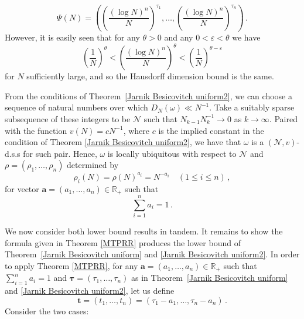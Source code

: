 \documentclass{amsart}
\theoremstyle{definition}
\newcommand{\R}{\mathbb R}
\newcommand{\0}{\mbf 0}%
\newcommand{\cN}{{\mathcal N}}
\def\R{\mathbb R}
\begin{document}
    \begin{equation*}
        \Psi(N)=\left(\left(\frac{(\log N)^{n}}{N}\right)^{\tau_{1}},\dots, \left(\frac{(\log N)^{n}}{N}\right)^{\tau_{n}} \right)\, .
    \end{equation*}
    However, it is easily seen that for any $\theta>0$ and any $0<\varepsilon< \theta$ we have  
    \begin{equation*}
        \left(\frac{1}{N}\right)^{\theta}<\left(\frac{(\log N)^{n}}{N}\right)^{\theta}<\left(\frac{1}{N}\right)^{\theta-\varepsilon}
    \end{equation*}
    for $N$ sufficiently large, and so the Hausdorff dimension bound is the same. \par 
    From the conditions of Theorem~\ref{Jarnik Besicovitch uniform2}, we can choose a sequence of natural numbers over which $D_{N}(\omega)\ll N^{-1}$. Take a suitably sparse subsequence of these integers to be $\cN$ such that $N_{k-1}N_{k}^{-1}\to 0$ as $k \to \infty$. Paired with the function $v(N)=cN^{-1}$, where $c$ is the implied constant in the condition of Theorem \ref{Jarnik Besicovitch uniform2}, we have that $\omega$ is a $(\cN,v)$-d.s.s for such pair. 
Hence, $\omega$ is locally ubiquitous with respect to $\cN$ and $\rho=(\rho_1,\ldots, \rho_n)$ determined by
    \begin{equation*}
        \rho_{i}(N)=\rho(N)^{a_{i}}=N^{-a_{i}} \quad (1\leq i \leq n)\, ,
    \end{equation*}
    for vector $\boldsymbol{a}=(a_{1},\dots, a_{n})\in\R_{+}$ such that
    \begin{equation*}
        \sum_{i=1}^{n}a_{i}=1\, .
    \end{equation*}
    \par
    We now consider both lower bound results in tandem. It remains to show the formula given in Theorem \ref{MTPRR} produces the lower bound of Theorem~\ref{Jarnik Besicovitch uniform} and \ref{Jarnik Besicovitch uniform2}.
In order to apply Theorem \ref{MTPRR}, for any $\mathbf{a}=(a_{1},\dots, a_{n})\in \R_{+}$ such that $\sum_{i=1}^{n}a_i=1$ and $\boldsymbol{\tau}=(\tau_{1},\dots,\tau_{n})$ as in Theorem~\ref{Jarnik Besicovitch uniform} and \ref{Jarnik Besicovitch uniform2}, let us define
\begin{equation*}
\textbf{t}=(t_{1},\dots, t_{n})=(\tau_{1}-a_{1}, \dots, \tau_{n}-a_{n})\, .
\end{equation*}
Consider the two cases:
\end{document}
